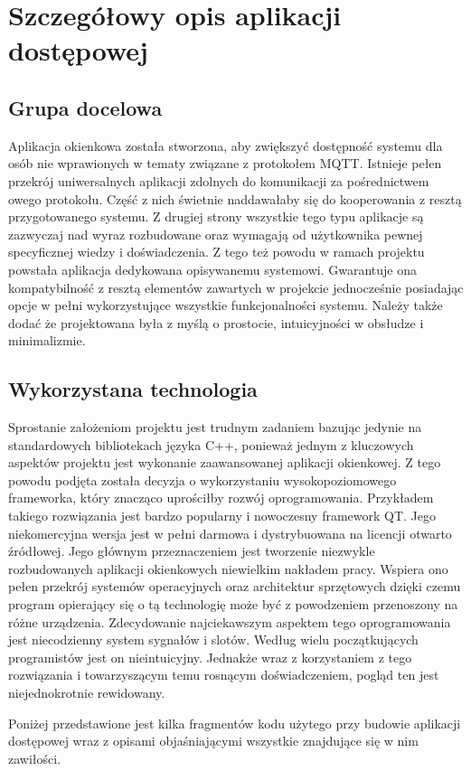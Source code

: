    
\chapter{Szczegółowy opis aplikacji dostępowej}
    \section{Grupa docelowa}
        Aplikacja okienkowa została stworzona, aby zwiększyć dostępność systemu dla osób nie wprawionych w tematy związane z protokołem MQTT. Istnieje pełen przekrój uniwersalnych aplikacji zdolnych do komunikacji za pośrednictwem owego protokołu. Część z nich świetnie naddawałaby się do kooperowania z resztą przygotowanego systemu. Z drugiej strony wszystkie tego typu aplikacje są zazwyczaj nad wyraz rozbudowane oraz wymagają od użytkownika pewnej specyficznej wiedzy i doświadczenia. Z tego też powodu w ramach projektu powstała aplikacja dedykowana opisywanemu systemowi. Gwarantuje ona kompatybilność z resztą elementów zawartych w projekcie jednocześnie posiadając opcje w pełni wykorzystujące wszystkie funkcjonalności systemu. Należy także dodać że projektowana była z myślą o prostocie, intuicyjności w obsłudze i minimalizmie.
        
    \section{Wykorzystana technologia}
        Sprostanie założeniom projektu jest trudnym zadaniem bazując jedynie na standardowych bibliotekach języka C++, ponieważ jednym z kluczowych aspektów projektu jest wykonanie zaawansowanej aplikacji okienkowej. Z tego powodu podjęta została decyzja o wykorzystaniu wysokopoziomowego frameworka, który znacząco uprościłby rozwój oprogramowania. Przykładem takiego rozwiązania jest bardzo popularny i nowoczesny framework QT. Jego niekomercyjna wersja jest w pełni darmowa i dystrybuowana na licencji otwarto źródłowej. Jego głównym przeznaczeniem jest tworzenie niezwykle rozbudowanych aplikacji okienkowych niewielkim nakładem pracy. Wspiera ono pełen przekrój systemów operacyjnych oraz architektur sprzętowych dzięki czemu program opierający się o tą technologię może być z powodzeniem przenoszony na różne urządzenia. Zdecydowanie najciekawszym aspektem tego oprogramowania jest niecodzienny system sygnałów i slotów. Według wielu początkujących programistów jest on nieintuicyjny. Jednakże wraz z korzystaniem z tego rozwiązania i towarzyszącym temu rosnącym doświadczeniem, pogląd ten jest niejednokrotnie rewidowany.  
        
        Poniżej przedstawione jest kilka fragmentów kodu użytego przy budowie aplikacji dostępowej wraz z opisami objaśniającymi wszystkie znajdujące się w nim zawiłości.
